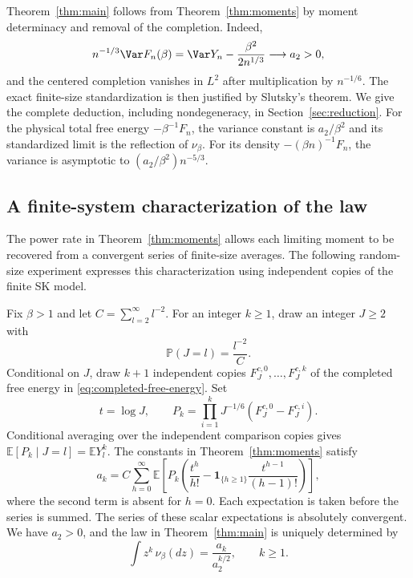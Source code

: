 Theorem~\ref{thm:main} follows from Theorem~\ref{thm:moments} by moment determinacy and removal of the completion. Indeed,
\[
 n^{-1/3}\Var F_n(\beta)
 =\Var Y_n-\frac{\beta^2}{2n^{1/3}}\longrightarrow a_2>0,
\]
and the centered completion vanishes in $L^2$ after multiplication by $n^{-1/6}$. The exact finite-size standardization is then justified by Slutsky's theorem. We give the complete deduction, including nondegeneracy, in Section~\ref{sec:reduction}.
For the physical total free energy $-\beta^{-1}F_n$, the variance
constant is $a_2/\beta^2$ and its standardized limit is the reflection
of $\nu_\beta$. For its density $-(\beta n)^{-1}F_n$, the variance is
asymptotic to $(a_2/\beta^2)n^{-5/3}$.

\subsection{A finite-system characterization of the law}

The power rate in Theorem~\ref{thm:moments} allows each limiting
moment to be recovered from a convergent series of finite-size averages.
The following random-size experiment expresses this characterization
using independent copies of the finite SK model.

\begin{proposition}\label{def:law}
Fix $\beta>1$ and let $C=\sum_{l=2}^{\infty}l^{-2}$. For an integer $k\ge1$, draw an integer $J\ge2$ with
\[
 \mathbb P(J=l)=\frac{l^{-2}}C.
\]
Conditional on $J$, draw $k+1$ independent copies $F_J^{c,0},\ldots,F_J^{c,k}$ of the completed free energy in \eqref{eq:completed-free-energy}. Set
\[
 t=\log J,
 \qquad P_k=\prod_{i=1}^k J^{-1/6}(F_J^{c,0}-F_J^{c,i}).
\]
Conditional averaging over the independent comparison copies gives
$\mathbb E[P_k\mid J=l]=\mathbb E Y_l^k$.
The constants in Theorem~\ref{thm:moments} satisfy
\begin{equation}\label{eq:law-moments}
 a_k=C\sum_{h=0}^{\infty}
 \mathbb E\!\left[P_k\left(\frac{t^h}{h!}
       -\mathbf1_{\{h\ge1\}}\frac{t^{h-1}}{(h-1)!}\right)\right],
\end{equation}
where the second term is absent for $h=0$. Each expectation is taken before the series is summed. The series of these scalar expectations is absolutely convergent. We have $a_2>0$, and the law in Theorem~\ref{thm:main} is uniquely determined by
\[
 \int z^k\,\nu_\beta(dz)=\frac{a_k}{a_2^{k/2}},\qquad k\ge1.
\]
\end{proposition}

